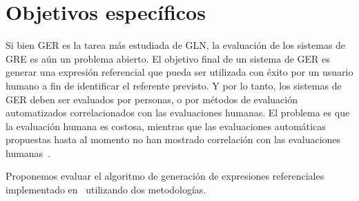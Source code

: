 \section{Objetivos espec\'ificos}
\label{objetivos}

Si bien GER es la tarea m\'as estudiada de GLN, la evaluaci\'on de los sistemas de GRE es a\'un un problema abierto. El objetivo final de un sistema de GER es generar una expresi\'on referencial que pueda ser utilizada con \'exito por un usuario humano a fin de identificar el referente previsto. Y por lo tanto, los sistemas de GER deben ser evaluados por personas, o por m\'etodos de evaluaci\'on automatizados correlacionados con las evaluaciones humanas. El problema es que la evaluaci\'on humana es costosa, mientras que las evaluaciones autom\'aticas propuestas hasta al momento no han mostrado correlaci\'on con las evaluaciones humanas~\cite{Reiter09}.

Proponemos evaluar el algoritmo de generaci\'on de expresiones referenciales implementado en~\cite{Areces2008} utilizando dos metodolog\'ias. 

